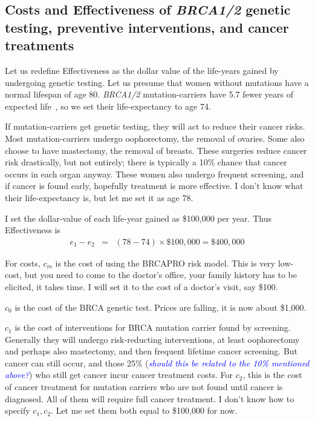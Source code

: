 \documentclass[11pt]{article}
\begin{document}
\subsection{Costs and Effectiveness of \textit{BRCA1/2} genetic testing, preventive interventions, and cancer treatments}

Let us redefine Effectiveness as the dollar value of the life-years gained by undergoing genetic testing.  Let us presume that  women without mutations have a normal lifespan of age 80.  \textit{BRCA1/2} mutation-carriers have 5.7 fewer years of expected life~\citep{mai}, so we set their life-expectancy to age 74.  

If mutation-carriers get genetic testing, they will act to reduce their cancer risks.  Most mutation-carriers undergo oophorectomy, the removal of ovaries.  Some also choose to have mastectomy, the removal of breasts.  These surgeries reduce cancer risk drastically, but not entirely; there is typically a 10\% chance that cancer occurs in each organ anyway.  These women also undergo frequent screening, and if cancer is found early, hopefully treatment is more effective.  I don't know what their life-expectancy is, but let me set it as age 78.

I set the dollar-value of each life-year gained as \$100,000 per year.  Thus Effectiveness is
\begin{eqnarray*}
e_1-e_2 &=& (78-74)\times\$100,000 = \$400,000
\end{eqnarray*}

For costs, $c_m$ is the cost of using the BRCAPRO risk model.  This is very low-cost, but you need to come to the doctor's office, your family history has to be elicited, it takes time.  I will set it to the cost of a doctor's visit, say \$100.

$c_0$ is the cost of the BRCA genetic test.  Prices are falling, it is now about \$1,000.

$c_1$ is the cost of interventions for BRCA mutation carrier found by screening.  Generally they will undergo risk-reducting interventions, at least oophorectomy and perhaps also mastectomy, and then frequent lifetime cancer screening.  But cancer can still occur, and those 25\% (\textcolor{blue}{\it should this be related to the 10\% mentioned above?}) who still get cancer incur cancer treatment costs.  For $c_2$, this is the cost of cancer treatment for mutation carriers who are not found until cancer is diagnosed.  All of them will require full cancer treatment.  I don't know how to specify $c_1,c_2$.  Let me set them both equal to \$100,000 for now.
\end{document}
